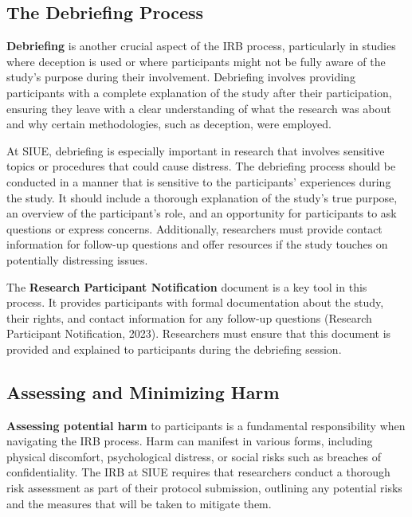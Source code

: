 \documentclass[
]{book}
\begin{document}
\subsection*{The Debriefing Process}\label{the-debriefing-process}

\textbf{Debriefing} is another crucial aspect of the IRB process, particularly in studies where deception is used or where participants might not be fully aware of the study's purpose during their involvement. Debriefing involves providing participants with a complete explanation of the study after their participation, ensuring they leave with a clear understanding of what the research was about and why certain methodologies, such as deception, were employed.

At SIUE, debriefing is especially important in research that involves sensitive topics or procedures that could cause distress. The debriefing process should be conducted in a manner that is sensitive to the participants' experiences during the study. It should include a thorough explanation of the study's true purpose, an overview of the participant's role, and an opportunity for participants to ask questions or express concerns. Additionally, researchers must provide contact information for follow-up questions and offer resources if the study touches on potentially distressing issues.

The \textbf{Research Participant Notification} document is a key tool in this process. It provides participants with formal documentation about the study, their rights, and contact information for any follow-up questions (Research Participant Notification, 2023). Researchers must ensure that this document is provided and explained to participants during the debriefing session.

\subsection*{Assessing and Minimizing Harm}\label{assessing-and-minimizing-harm}

\textbf{Assessing potential harm} to participants is a fundamental responsibility when navigating the IRB process. Harm can manifest in various forms, including physical discomfort, psychological distress, or social risks such as breaches of confidentiality. The IRB at SIUE requires that researchers conduct a thorough risk assessment as part of their protocol submission, outlining any potential risks and the measures that will be taken to mitigate them.
\end{document}
